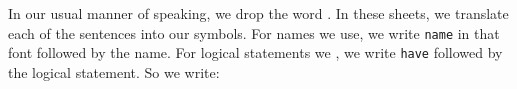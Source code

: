 In our usual manner of speaking, we drop the word .
In these sheets, we translate each of the sentences into our symbols.
For names we use, we write \texttt{name} in that font followed by the name.
For logical statements we , we write \texttt{have} followed by the logical statement.
So we write:

\begin{account}
\end{account}




